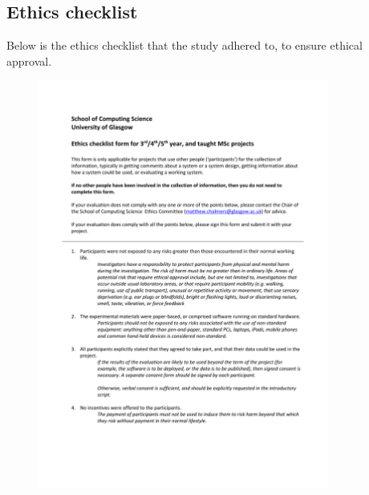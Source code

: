 \documentclass{l4proj}
\begin{document}
\begin{appendices}
\chapter{Ethics checklist}
Below is the ethics checklist that the study adhered to, to ensure ethical approval.
\begin{figure}[h!]
    \centering
    \includegraphics[width=0.85\textwidth]{images/Ethics check-signed1.pdf}
\end{figure}
\begin{figure}[h!]
    \centering

\end{figure}
\end{appendices}
\end{document}
